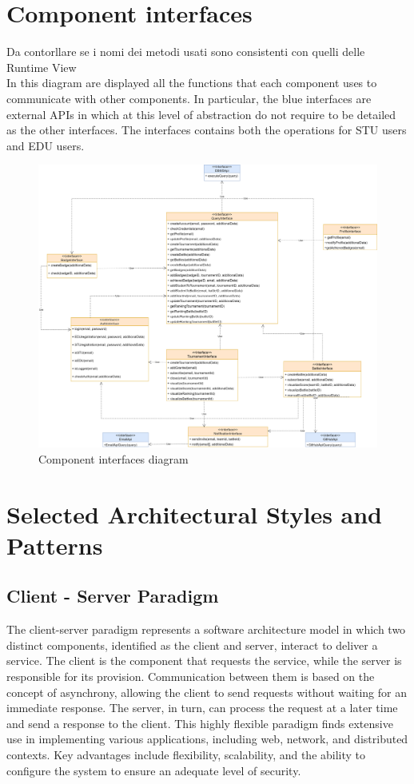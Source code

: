 \section{Component interfaces}
{\color{green} Da contorllare se i nomi dei metodi usati sono consistenti con quelli delle Runtime View \\}
In this diagram are displayed all the functions that each component uses to communicate with other components. In particular, the blue interfaces are external APIs in which at this level of abstraction do not require to be detailed as the other interfaces. The interfaces contains both the operations for STU users and EDU users. 
\begin{figure}[H]
    \centering
    \includegraphics[width=\textwidth]{images/diagrams/ComponentInterfaces.png}
    \caption{Component interfaces diagram}
\end{figure}

\newpage

\section{Selected Architectural Styles and Patterns}
\subsection{Client - Server Paradigm}
The client-server paradigm represents a software architecture model in which two distinct components, identified as the client and server, interact to deliver a service. 
The client is the component that requests the service, while the server is responsible for its provision.
Communication between them is based on the concept of asynchrony, allowing the client to send requests without waiting for an immediate response. 
The server, in turn, can process the request at a later time and send a response to the client. This highly flexible paradigm finds extensive use in implementing various applications, including web, network, and distributed contexts.
Key advantages include flexibility, scalability, and the ability to configure the system to ensure an adequate level of security.

